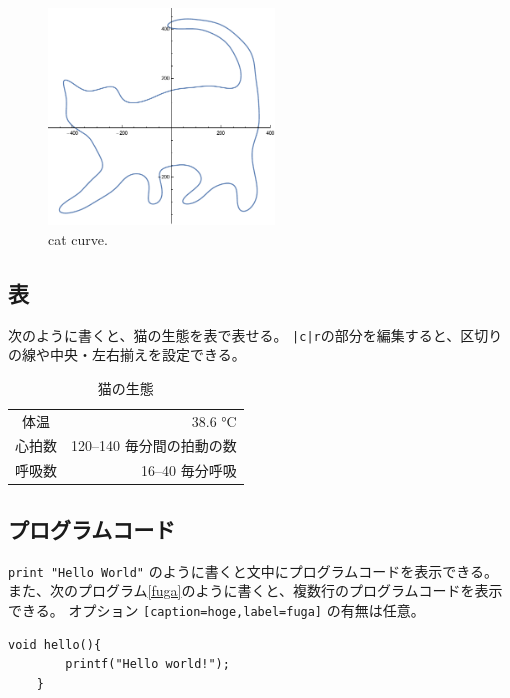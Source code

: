\documentclass[uplatex, a4paper,twocolumn, 14pt]{jsarticle}
\begin{document}
\begin{figure}[tbh]
    \begin{center}
        \includegraphics[width=6cm]{graphics/cat_curve.pdf}
        \caption{
            cat curve.
        }
        \label{graph:cat_curve}
    \end{center}
\end{figure}

\subsection{表}
次のように書くと、猫の生態を表で表せる。
\lstinline{|c|r}の部分を編集すると、区切りの線や中央・左右揃えを設定できる。

\begin{table}[tbh]
    \begin{center}
        \begin{tabular}{|c|r}
            体温 & 38.6 °C \\
            心拍数 & 120–140 毎分間の拍動の数 \\
            呼吸数 & 16–40 毎分呼吸
        \end{tabular}
        \caption{猫の生態\cite{kahn2007merck}}
        \label{tab:table-name}
    \end{center}
\end{table}

\subsection{プログラムコード}

\lstinline{print "Hello World"} のように書くと文中にプログラムコードを表示できる。
また、次のプログラム\ref{fuga}のように書くと、複数行のプログラムコードを表示できる。
オプション \lstinline{[caption=hoge,label=fuga]} の有無は任意。

\begin{lstlisting}[caption=hoge,label=fuga]
    void hello(){
        printf("Hello world!");
    }
\end{lstlisting}
\end{document}
